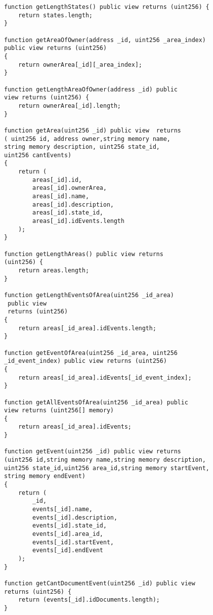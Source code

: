\begin{verbatim}
        function getLengthStates() public view returns (uint256) {
            return states.length;
        }
    
        function getAreaOfOwner(address _id, uint256 _area_index) 
        public view returns (uint256)
        {
            return ownerArea[_id][_area_index];
        }
    
        function getLengthAreaOfOwner(address _id) public 
        view returns (uint256) {
            return ownerArea[_id].length;
        }
    
        function getArea(uint256 _id) public view  returns 
        ( uint256 id, address owner,string memory name,
        string memory description, uint256 state_id,
        uint256 cantEvents)
        {
            return (
                areas[_id].id,
                areas[_id].ownerArea,
                areas[_id].name,
                areas[_id].description,
                areas[_id].state_id,
                areas[_id].idEvents.length
            );
        }
    
        function getLengthAreas() public view returns 
        (uint256) {
            return areas.length;
        }
    
        function getLengthEventsOfArea(uint256 _id_area)
         public view
         returns (uint256)
        {
            return areas[_id_area].idEvents.length;
        }
    
        function getEventOfArea(uint256 _id_area, uint256 
        _id_event_index) public view returns (uint256)
        {
            return areas[_id_area].idEvents[_id_event_index];
        }
    
        function getAllEventsOfArea(uint256 _id_area) public 
        view returns (uint256[] memory)
        {
            return areas[_id_area].idEvents;
        }
    
        function getEvent(uint256 _id) public view returns 
        (uint256 id,string memory name,string memory description,
        uint256 state_id,uint256 area_id,string memory startEvent,
        string memory endEvent)
        {
            return (
                _id,
                events[_id].name,
                events[_id].description,
                events[_id].state_id,
                events[_id].area_id,
                events[_id].startEvent,
                events[_id].endEvent
            );
        }
    
        function getCantDocumentEvent(uint256 _id) public view 
        returns (uint256) {
            return (events[_id].idDocuments.length);
        }
    

\end{verbatim}
